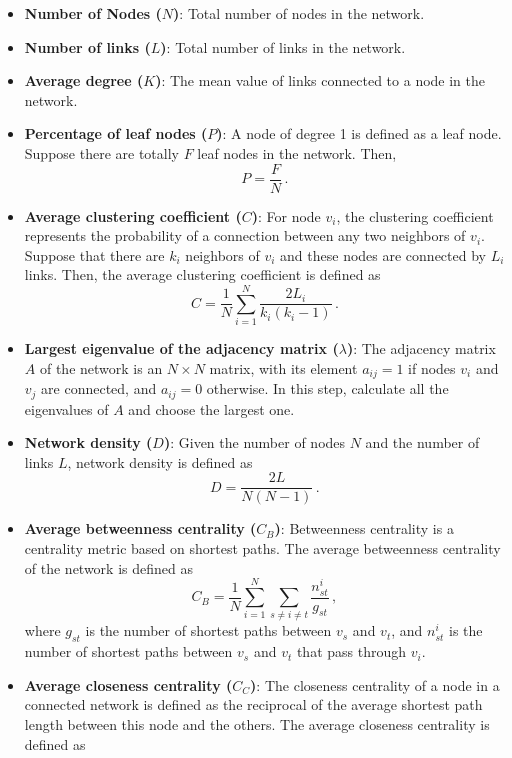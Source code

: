 \documentclass[10pt,journal,compsoc]{IEEEtran}
\begin{document}
\begin{itemize}
\item \textbf{Number of Nodes ($N$)}: Total number of nodes in the network.
\item \textbf{Number of links ($L$)}: Total number of links in the network.
\item \textbf{Average degree ($K$)}: The mean value of links connected to a node in the network.
\item \textbf{Percentage of leaf nodes ($P$)}: A node of degree 1 is defined as a leaf node. Suppose there are totally $F$ leaf nodes in the network. Then,
\begin{equation}
P=\frac{F}{N}\,.
\end{equation}
\item \textbf{Average clustering coefficient ($C$)}: For node $v_i$, the clustering coefficient represents the probability of a connection between any two neighbors of $v_i$. Suppose that there are $k_i$ neighbors of $v_i$ and these nodes are connected by $L_i$ links. Then, the average clustering coefficient is defined as
\begin{equation}
C=\frac{1}{N}\sum_{i=1}^N\frac{2L_i}{k_i(k_i-1)}\,.
\end{equation}
\item \textbf{Largest eigenvalue of the adjacency matrix ($\lambda$)}: The adjacency matrix $A$ of the network is an $N\times{N}$ matrix, with its element $a_{ij}=1$ if nodes $v_i$ and $v_j$ are connected, and $a_{ij}=0$ otherwise. In this step, calculate all the eigenvalues of $A$ and choose the largest one.
\item \textbf{Network density ($D$)}: Given the number of nodes $N$ and the number of links $L$, network density is defined as
\begin{equation}
D=\frac{2L}{N(N-1)}\,.
\end{equation}
\item \textbf{Average betweenness centrality ($C_B$)}: Betweenness centrality is a centrality metric based on shortest paths. The average betweenness centrality of the network is defined as
\begin{equation}
C_B=\frac{1}{N}\sum_{i=1}^N\sum_{s\neq i\neq t} {\frac{n^{i}_{st}}{g_{st}}}\,,
\end{equation}
where $g_{st}$ is the number of shortest paths between $v_s$ and $v_t$, and $n^{i}_{st}$ is the number of shortest paths between $v_s$ and $v_t$ that pass through $v_i$.  	
\item \textbf{Average closeness centrality ($C_C$)}: The closeness centrality of a node in a connected network is defined as the reciprocal of the average shortest path length between this node and the others. The average closeness centrality is defined as

\end{itemize}
\end{document}
